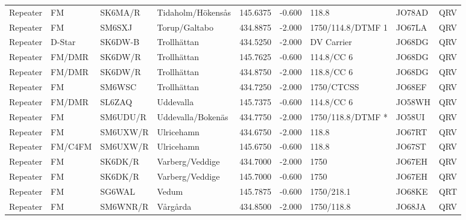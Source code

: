 {\begin{landscape}
\begin{longtable}{llllrrlll}
	Repeater          & FM              & SK6MA/R  & Tidaholm/Hökensås     &     145.6375 &     -0.600 & 118.8             & JO78AD      & QRV      \\
	Repeater          & FM              & SM6SXJ   & Torup/Galtabo         &     434.8875 &     -2.000 & 1750/114.8/DTMF 1 & JO67LA      & QRV      \\
	Repeater          & D-Star          & SK6DW-B  & Trollhättan           &     434.5250 &     -2.000 & DV Carrier        & JO68DG      & QRV      \\
	Repeater          & FM/DMR          & SK6DW/R  & Trollhättan           &     145.7625 &     -0.600 & 114.8/CC 6        & JO68DG      & QRV      \\
	Repeater          & FM/DMR          & SK6DW/R  & Trollhättan           &     434.8750 &     -2.000 & 118.8/CC 6        & JO68DG      & QRV      \\
	Repeater          & FM              & SM6WSC   & Trollhättan           &     434.7250 &     -2.000 & 1750/CTCSS        & JO68EF      & QRV      \\
	Repeater          & FM/DMR          & SL6ZAQ   & Uddevalla             &     145.7375 &     -0.600 & 114.8/CC 6        & JO58WH      & QRV      \\
	Repeater          & FM              & SM6UDU/R & Uddevalla/Bokenäs     &     434.7750 &     -2.000 & 1750/118.8/DTMF * & JO58UI      & QRV      \\
	Repeater          & FM              & SM6UXW/R & Ulricehamn            &     434.6750 &     -2.000 & 118.8             & JO67RT      & QRV      \\
	Repeater          & FM/C4FM         & SM6UXW/R & Ulricehamn            &     145.6750 &     -0.600 & 118.8             & JO67ST      & QRV      \\
	Repeater          & FM              & SK6DK/R  & Varberg/Veddige       &     434.7000 &     -2.000 & 1750              & JO67EH      & QRV      \\
	Repeater          & FM              & SK6DK/R  & Varberg/Veddige       &     145.7000 &     -0.600 & 1750              & JO67EH      & QRV      \\
	Repeater          & FM              & SG6WAL   & Vedum                 &     145.7875 &     -0.600 & 1750/218.1        & JO68KE      & QRT      \\
	Repeater          & FM              & SM6WNR/R & Vårgårda              &     434.8500 &     -2.000 & 1750/118.8        & JO68JA      & QRV      \\

\end{longtable}
\end{landscape}}
